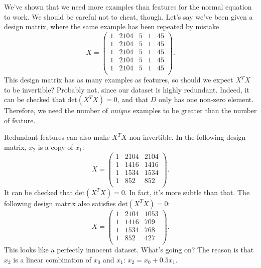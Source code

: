 \documentclass{article}
\theoremstyle{definition}
\begin{document}
We've shown that we need more examples than features for the normal equation to work. We should be careful not to cheat, though. Let's say we've been given a design matrix, where the same example has been repeated by mistake
\begin{equation}
        X =
    \begin{pmatrix}
        1 & 2104 & 5 & 1 & 45 \\
        1 & 2104 & 5 & 1 & 45 \\
        1 & 2104 & 5 & 1 & 45 \\
        1 & 2104 & 5 & 1 & 45 \\
        1 & 2104 & 5 & 1 & 45 \\
    \end{pmatrix}.
\end{equation}
This design matrix has as many examples as features, so should we expect $X^TX$ to be invertible? Probably not, since our dataset is highly redundant. Indeed, it can be checked that $\text{det}(X^TX)=0$, and that $D$ only has one non-zero element. Therefore, we need the number of \textit{unique} examples to be greater than the number of feature.

Redundant features can also make $X^TX$ non-invertible. In the following design matrix, $x_2$ is a copy of $x_1$:
\begin{equation}
        X =
    \begin{pmatrix}
        1 & 2104 & 2104 \\
        1 & 1416 & 1416 \\
        1 & 1534 & 1534 \\
        1 & 852 & 852 \\
    \end{pmatrix}.
\end{equation}
It can be checked that $\text{det}(X^TX)=0$. In fact, it's more subtle than that. The following design matrix also satisfies $\text{det}(X^TX)=0$:
\begin{equation}
        X =
    \begin{pmatrix}
        1 & 2104 & 1053 \\
        1 & 1416 & 709 \\
        1 & 1534 & 768 \\
        1 & 852 & 427 \\
    \end{pmatrix}.
\end{equation}
This looks like a perfectly innocent dataset. What's going on?
The reason is that $x_2$ is a linear combination of $x_0$ and $x_1$: $x_2 = x_0 + 0.5 x_1$.
\end{document}
